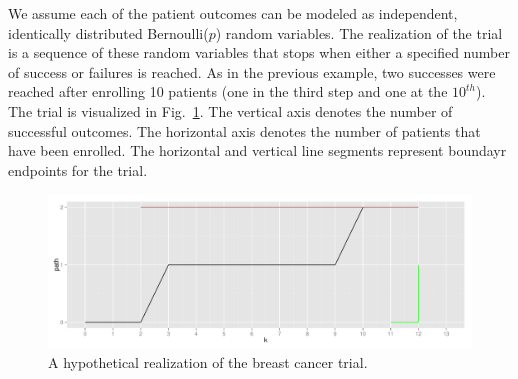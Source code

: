 \documentclass[12pt]{article}         %
\begin{document}
We assume each of the patient outcomes can be modeled as independent, 
identically distributed Bernoulli($p$) random variables. The realization of 
the trial is a sequence of these random variables that stops when either a 
specified number of success or failures is reached. As in the 
previous example, two successes were reached after enrolling 10 
patients (one in the third step and one at the $10^{th}$). The trial is 
visualized in Fig.~\ref{fig:kane_viz}. The vertical axis denotes the number of 
successful outcomes. The horizontal axis denotes the number of patients that 
have been enrolled. The horizontal and vertical line segments represent 
boundayr endpoints for the trial. 

\begin{figure}[ht]
\includegraphics[width=\textwidth]{KanePlot.pdf}
\caption{
A hypothetical realization of the breast cancer trial.
}
\label{fig:kane_viz}
\end{figure}

\end{document}
